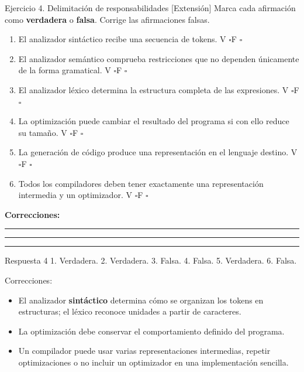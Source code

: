 \documentclass[11pt,spanish]{article}
\newcommand{\blank}[1][4cm]{\rule{#1}{0.4pt}}
\newcommand{\cuadro}{\(\square\)}
\begin{document}
\begin{ejercicio}{Ejercicio 4. Delimitación de responsabilidades \hfill {\small [Extensión]}}
Marca cada afirmación como \textbf{verdadera} o \textbf{falsa}. Corrige las afirmaciones falsas.

\begin{enumerate}[leftmargin=*]
    \item El analizador sintáctico recibe una secuencia de tokens. \hfill V \cuadro\quad F \cuadro
    \item El analizador semántico comprueba restricciones que no dependen únicamente de la forma gramatical. \hfill V \cuadro\quad F \cuadro
    \item El analizador léxico determina la estructura completa de las expresiones. \hfill V \cuadro\quad F \cuadro
    \item La optimización puede cambiar el resultado del programa si con ello reduce su tamaño. \hfill V \cuadro\quad F \cuadro
    \item La generación de código produce una representación en el lenguaje destino. \hfill V \cuadro\quad F \cuadro
    \item Todos los compiladores deben tener exactamente una representación intermedia y un optimizador. \hfill V \cuadro\quad F \cuadro
\end{enumerate}

\ifrespuestas\else
\textbf{Correcciones:}

\blank[14cm]

\blank[14cm]

\blank[14cm]
\fi
\end{ejercicio}

\ifrespuestas
\begin{respuesta}{Respuesta 4}
1. Verdadera. 2. Verdadera. 3. Falsa. 4. Falsa. 5. Verdadera. 6. Falsa.

Correcciones:
\begin{itemize}[leftmargin=*]
    \item El analizador \textbf{sintáctico} determina cómo se organizan los tokens en estructuras; el léxico reconoce unidades a partir de caracteres.
    \item La optimización debe conservar el comportamiento definido del programa.
    \item Un compilador puede usar varias representaciones intermedias, repetir optimizaciones o no incluir un optimizador en una implementación sencilla.
\end{itemize}
\end{respuesta}
\fi
\end{document}
